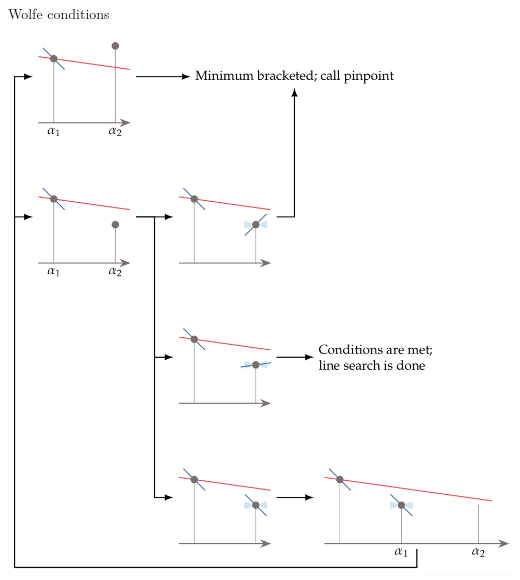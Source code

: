 \documentclass[11pt,compress,t,notes=noshow, xcolor=table]{beamer}
\begin{document}
\begin{vbframe}{Wolfe conditions}
        \begin{center}
            \includegraphics[height=0.5\textheight,keepaspectratio]{figure_man/wolfe_bracketing.png}~~

\end{center}
\end{vbframe}
\end{document}
